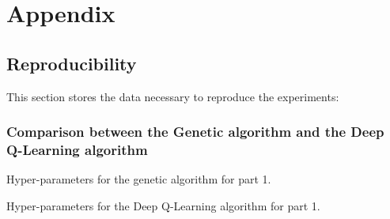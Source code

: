 \documentclass[11pt,a4paper]{article}
\begin{document}
\newpage
\section*{Appendix}
\subsection*{Reproducibility}
This section stores the data necessary to reproduce the experiments: \subsubsection*{Comparison between the Genetic algorithm and the Deep Q-Learning algorithm}
Hyper-parameters for the genetic algorithm for part 1.
\begin{mybox}
    \tiny{
}
\end{mybox}
\label{Hyperparameters}
Hyper-parameters for the Deep Q-Learning algorithm for part 1.
\begin{mybox}
    \tiny{
}
\end{mybox}
\end{document}
